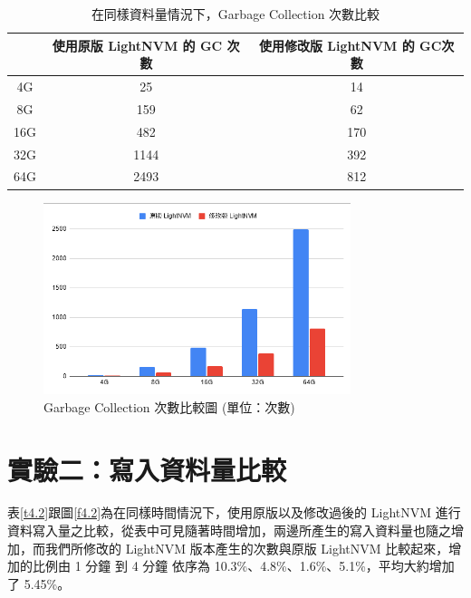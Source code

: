 \begin{table}[H]
    \begin{center}
        \caption{在同樣資料量情況下，Garbage Collection 次數比較}\label{t4.1}
        \begin{tabular}{|c|c|c|}\hline
                & 使用原版 LightNVM 的 GC 次數 & 使用修改版 LightNVM 的 GC次數 \\\hline
            4G  & 25                    & 14                    \\\hline
            8G  & 159                   & 62                    \\\hline
            16G & 482                   & 170                   \\\hline
            32G & 1144                  & 392                   \\\hline
            64G & 2493                  & 812                   \\\hline
        \end{tabular}
    \end{center}
\end{table}

\begin{figure}[H]
    \centering
    \includegraphics[width=0.8\textwidth]{picture/ch4/gc_chart.png}
    \caption{Garbage Collection 次數比較圖 (單位：次數)}
    \label{f4.1}
\end{figure}

\section{實驗二：寫入資料量比較}\label{s4.3}

\indent
表\ref{t4.2}跟圖\ref{f4.2}為在同樣時間情況下，使用原版以及修改過後的 LightNVM 進行資料寫入量之比較，從表中可見隨著時間增加，兩邊所產生的寫入資料量也隨之增加，而我們所修改的 LightNVM 版本產生的次數與原版 LightNVM 比較起來，增加的比例由 1 分鐘 到 4 分鐘 依序為 10.3\%、4.8\%、1.6\%、5.1\%，平均大約增加了 5.45\%。

